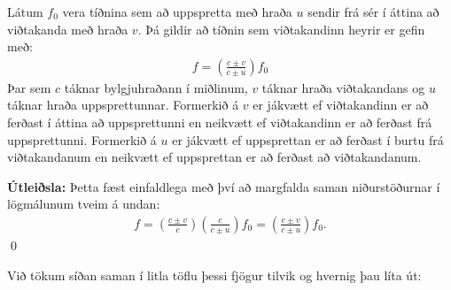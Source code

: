 \ifdefined \wholebook \else\documentclass[oneside]{book}\usepackage{EdlBook}\graphicspath{{figures/}}
\begin{document}
\begin{tcolorbox}
\begin{theorem}
Látum $f_0$ vera tíðnina sem að uppspretta með hraða $u$ sendir frá sér í áttina að viðtakanda með hraða $v$. Þá gildir að tíðnin sem viðtakandinn heyrir er gefin með:
\begin{align*}
    f = \left( \frac{c \pm v}{c \pm u} \right)f_0
\end{align*}
Þar sem $c$ táknar bylgjuhraðann í miðlinum, $v$ táknar hraða viðtakandans og $u$ táknar hraða uppsprettunnar. Formerkið á $v$ er jákvætt ef viðtakandinn er að ferðast í áttina að uppsprettunni en neikvætt ef viðtakandinn er að ferðast frá uppsprettunni. Formerkið á $u$ er jákvætt ef uppsprettan er að ferðast í burtu frá viðtakandanum en neikvætt ef uppsprettan er að ferðast að viðtakandanum.
\end{theorem}
\end{tcolorbox}

\textbf{Útleiðsla:} Þetta fæst einfaldlega með því að margfalda saman niðurstöðurnar í lögmálunum tveim á undan:
\begin{align*}
    f = \left( \frac{c\pm v}{c} \right)\left( \frac{c}{c\pm u} \right)f_0 = \left( \frac{c \pm v}{c \pm u} \right)f_0.
\end{align*}
\qed

Við tökum síðan saman í litla töflu þessi fjögur tilvik og hvernig þau líta út:
\end{document}

